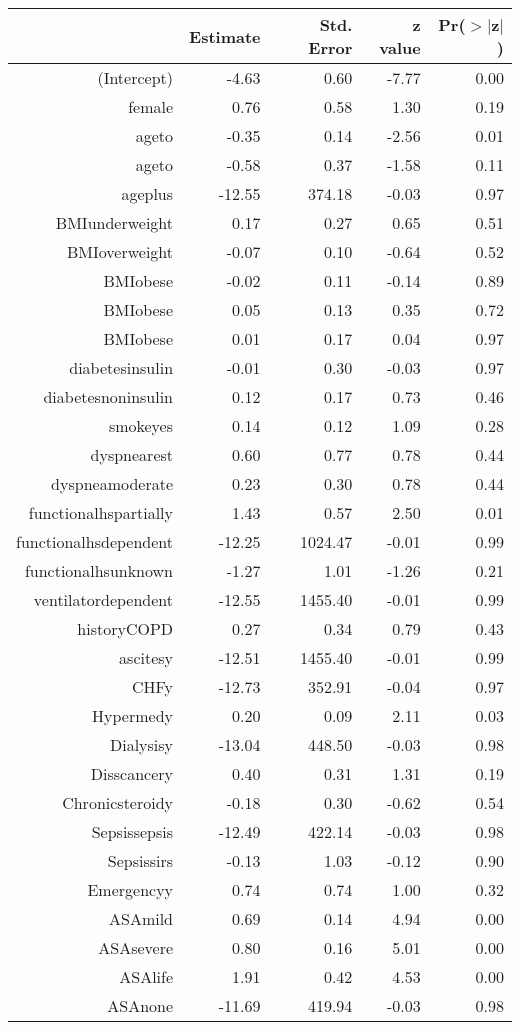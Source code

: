 \bigskip\bigskip
\centering
\begin{tabular}{rrrrr}
  \hline
 & Estimate & Std. Error & z value & Pr($>$$|$z$|$) \\ 
  \hline
(Intercept) & -4.63 & 0.60 & -7.77 & 0.00 \\ 
  female & 0.76 & 0.58 & 1.30 & 0.19 \\ 
  age\-65\-to\-74 & -0.35 & 0.14 & -2.56 & 0.01 \\ 
  age\-75\-to\-84 & -0.58 & 0.37 & -1.58 & 0.11 \\ 
  age\-85\-plus & -12.55 & 374.18 & -0.03 & 0.97 \\ 
  BMI\-underweight & 0.17 & 0.27 & 0.65 & 0.51 \\ 
  BMI\-overweight & -0.07 & 0.10 & -0.64 & 0.52 \\ 
  BMI\-obese\-1 & -0.02 & 0.11 & -0.14 & 0.89 \\ 
  BMI\-obese\-2 & 0.05 & 0.13 & 0.35 & 0.72 \\ 
  BMI\-obese\-3 & 0.01 & 0.17 & 0.04 & 0.97 \\ 
  diabetes\-insulin & -0.01 & 0.30 & -0.03 & 0.97 \\ 
  diabetes\-noninsulin & 0.12 & 0.17 & 0.73 & 0.46 \\ 
  smoke\-yes & 0.14 & 0.12 & 1.09 & 0.28 \\ 
  dyspnea\-rest & 0.60 & 0.77 & 0.78 & 0.44 \\ 
  dyspnea\-moderate & 0.23 & 0.30 & 0.78 & 0.44 \\ 
  functional\-hs\-partially & 1.43 & 0.57 & 2.50 & 0.01 \\ 
  functional\-hs\-dependent & -12.25 & 1024.47 & -0.01 & 0.99 \\ 
  functional\-hs\-unknown & -1.27 & 1.01 & -1.26 & 0.21 \\ 
  ventilator\-dependent & -12.55 & 1455.40 & -0.01 & 0.99 \\ 
  history\-COPD & 0.27 & 0.34 & 0.79 & 0.43 \\ 
  ascites\-y & -12.51 & 1455.40 & -0.01 & 0.99 \\ 
  CHF\-y & -12.73 & 352.91 & -0.04 & 0.97 \\ 
  Hyper\-med\-y & 0.20 & 0.09 & 2.11 & 0.03 \\ 
  Dialysis\-y & -13.04 & 448.50 & -0.03 & 0.98 \\ 
  Diss\-cancer\-y & 0.40 & 0.31 & 1.31 & 0.19 \\ 
  Chronic\-steroid\-y & -0.18 & 0.30 & -0.62 & 0.54 \\ 
  Sepsis\-sepsis & -12.49 & 422.14 & -0.03 & 0.98 \\ 
  Sepsis\-sirs & -0.13 & 1.03 & -0.12 & 0.90 \\ 
  Emergency\-y & 0.74 & 0.74 & 1.00 & 0.32 \\ 
  ASA\-mild & 0.69 & 0.14 & 4.94 & 0.00 \\ 
  ASA\-severe & 0.80 & 0.16 & 5.01 & 0.00 \\ 
  ASA\-life & 1.91 & 0.42 & 4.53 & 0.00 \\ 
  ASA\-none & -11.69 & 419.94 & -0.03 & 0.98 \\ 
   \hline
\end{tabular}
